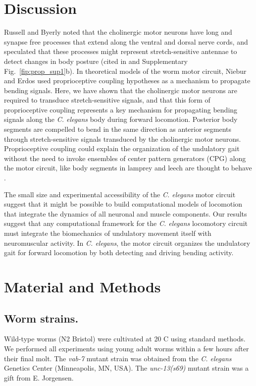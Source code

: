 \section{Discussion}
Russell and Byerly noted that the cholinergic motor neurons have long and synapse free 
processes that extend along the ventral and dorsal nerve cords, and speculated that these 
processes might represent stretch-sensitive antennae to detect changes in body posture (cited in 
 \citep{white_structure_1986,chen_neuronal_2007} and Supplementary Fig.~\ref{fip:prop_sup1}b). In theoretical models of the worm motor circuit, 
Niebur and Erdos \citep{niebur_theory_1991} used proprioceptive coupling hypotheses as a mechanism to propagate 
bending signals. Here, we have shown that the cholinergic motor neurons are required to 
transduce stretch-sensitive signals, and that this form of proprioceptive coupling represents a key 
mechanism for propagating bending signals along the \textit{C. elegans} body during forward 
locomotion. Posterior body segments are compelled to bend in the same direction as anterior 
segments through stretch-sensitive signals transduced by the cholinergic motor neurons. 
Proprioceptive coupling could explain the organization of the undulatory gait without the need to 
invoke ensembles of center pattern generators (CPG) along the motor circuit, like body segments 
in lamprey and leech are thought to behave \citep{ermentrout_frequency_1984}.  
 
The small size and experimental accessibility of the \textit{C. elegans} motor circuit suggest that it might 
be possible to build computational models of locomotion that integrate the dynamics of all 
neuronal and muscle components. Our results suggest that any computational framework for the 
\textit{C. elegans} locomotory circuit must integrate the biomechanics of undulatory movement itself 
with neuromuscular activity. In \textit{C. elegans}, the motor circuit organizes the undulatory gait for forward locomotion by both detecting and driving bending activity.


\section{Material and Methods} 
 
\subsection{Worm strains.} 
Wild-type worms (N2 Bristol) were cultivated at 20 \textdegree C using standard methods. 
We performed all experiments using young adult worms within a few hours after their final molt. 
The \textit{vab-7} mutant strain was obtained from the \textit{C. elegans} Genetics Center (Minneapolis, MN, USA). The \textit{unc-13(s69)} mutant strain was a gift from E. Jorgensen. 
 
